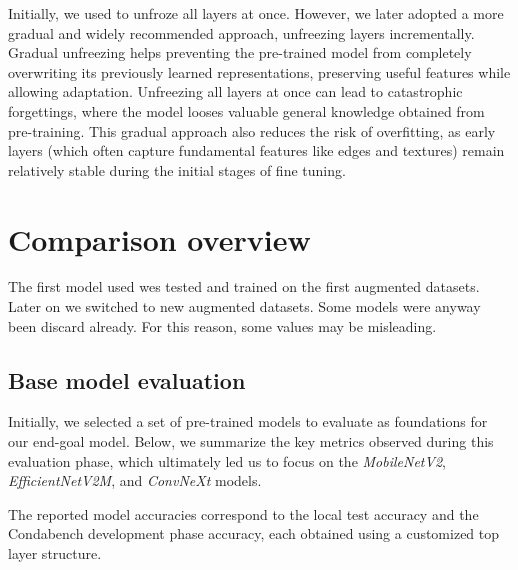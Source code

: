 \documentclass[11pt]{article}
\begin{document}
Initially, we used to unfroze all layers at once. 
However, we later adopted a more gradual and widely recommended approach, unfreezing layers incrementally. 
Gradual unfreezing helps preventing the pre-trained model from completely overwriting its previously learned representations, preserving useful features while allowing adaptation. Unfreezing all layers at once can lead to catastrophic forgettings, where the model looses valuable general knowledge obtained from pre-training.
This gradual approach also reduces the risk of overfitting, as early layers (which often capture fundamental features like edges and textures) remain relatively stable during the initial stages of fine tuning.

\section{Comparison overview}

The first model used wes tested and trained on the first augmented datasets.
Later on we switched to new augmented datasets. Some models were anyway been discard already. 
For this reason, some values may be misleading.

\subsection{Base model evaluation}

Initially, we selected a set of pre-trained models to evaluate as foundations for our end-goal model. Below, we summarize the key metrics observed during this evaluation phase, which ultimately led us to focus on the \textit{MobileNetV2}, \textit{EfficientNetV2M}, and \textit{ConvNeXt} models.

The reported model accuracies correspond to the local test accuracy and the Condabench development phase accuracy, each obtained using a customized top layer structure.  
\end{document}
